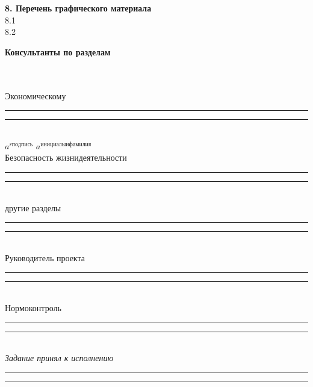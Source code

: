 \begin{titlepage}
\begin{flushleft}
\textbf{8. Перечень графического материала}
\fontsize{8pt}{8.05pt}{\selectfont{(рисунки, фотографии, чертежи, графики, и прочие иллюстрации, обязательные к представлению
в ходе защиты в электронном виде)} } \\
8.1\hrulefill \\
8.2\hrulefill \\
\end{flushleft}

\begin{flushleft}
\textbf{Консультанты по разделам}\hrulefill \\
\hrulefill \\
\hrulefill \\
\end{flushleft}

\begin{flushleft}
\hspace{1.5cm} Экономическому 			\hspace{2.7cm} \rule{2.9cm}{0.5pt} \hspace{2cm} \rule{4.0cm}{0.5pt} \\

${a^{rподпись}}$ \hspace{2cm} ${a^{инициалы и фамилия}}$ \\

\hspace{0cm} Безопасность жизнидеятельности	\hspace{0.5cm} \rule{2.9cm}{0.5pt} \hspace{2cm} \rule{4.0cm}{0.5pt} \\
\hspace{1.7cm} другие разделы 			\hspace{2.8cm} \rule{2.9cm}{0.5pt} \hspace{2cm} \rule{4.0cm}{0.5pt} \\
\hspace{1.0cm} Руководитель проекта 		\hspace{2.0cm} \rule{2.9cm}{0.5pt} \hspace{2cm} \rule{4.0cm}{0.5pt} \\
\hspace{1.7cm} Нормоконтроль 			\hspace{2.8cm} \rule{2.9cm}{0.5pt} \hspace{2cm} \rule{4.0cm}{0.5pt} \\

\hspace{0.5cm} \textit{Задание принял к исполнению} \hspace{0.7cm} \rule{2.9cm}{0.5pt} \hspace{2cm} \rule{4cm}{0.5pt} \\

\end{flushleft}

\end{titlepage}
